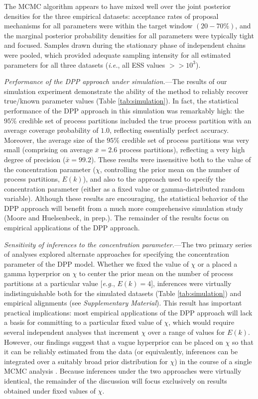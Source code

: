 \documentclass[11pt]{article}
\begin{document}
The MCMC algorithm appears to have mixed well over the joint posterior densities for the three empirical datasets: acceptance rates of proposal mechanisms for all parameters were within the target window $({20-70\%})$, and the marginal posterior probability densities for all parameters were typically tight and focused.  
Samples drawn during the stationary phase of independent chains were pooled, which provided adequate sampling intensity for all estimated parameters for all three datasets ({\it i.e.}, all ESS values ${>>10^3}$).

\bigskip
\noindent
{\it Performance of the DPP approach under simulation.}---The results of our simulation experiment demonstrate the ability of the method to reliably recover true/known parameter values (Table \ref{tab:simulation}).
In fact, the statistical performance of the DPP approach in this simulation was remarkably high: the $95\%$ credible set of process partitions included the true process partition with an average coverage probability of $1.0$, reflecting essentially perfect accuracy.
Moreover, the average size of the $95\%$ credible set of process partitions was very small (comprising on average $\bar{x} = 2.6$ process partitions), reflecting a very high degree of precision ($\bar{x} = 99.2$).
These results were insensitive both to the value of the concentration parameter ($\chi$, controlling the prior mean on the number of process partitions, $E(k)$), and also to the approach used to specify the  concentration parameter (either as a fixed value or gamma-distributed random variable).
Although these results are encouraging, the statistical behavior of the DPP approach will benefit from a much more comprehensive simulation study (Moore and Huelsenbeck, in prep.).
The remainder of the results focus on empirical applications of the DPP approach.


\bigskip
\noindent
{\it Sensitivity of inferences to the concentration parameter.}---The two primary series of analyses explored alternate approaches for specifying the concentration parameter of the DPP model.  
Whether we fixed the value of $\chi$ or a placed a gamma hyperprior on $\chi$ to center the prior mean on the number of process partitions at a particular value [{\it e.g.}, $E(k)=4$], inferences were virtually indistinguishable both for the simulated datasets (Table \ref{tab:simulation}) and empirical alignments (see {\it Supplementary Material}). 
This result has important practical implications: most empirical applications of the DPP approach will lack a basis for committing to a particular fixed value of $\chi$, which would require several independent analyses that increment $\chi$ over a range of values for $E(k)$.  
However, our findings suggest that a vague hyperprior can be placed on $\chi$ so that it can be reliably estimated from the data (or equivalently, inferences can be integrated over a suitably broad prior distribution for $\chi$) in the course of a single MCMC analysis \citep[{\it c.f.},][]{escobar95, west94, gelfand05, dorazio09}.
Because inferences under the two approaches were virtually identical, the remainder of the discussion will focus exclusively on results obtained under fixed values of $\chi$.
\end{document}

